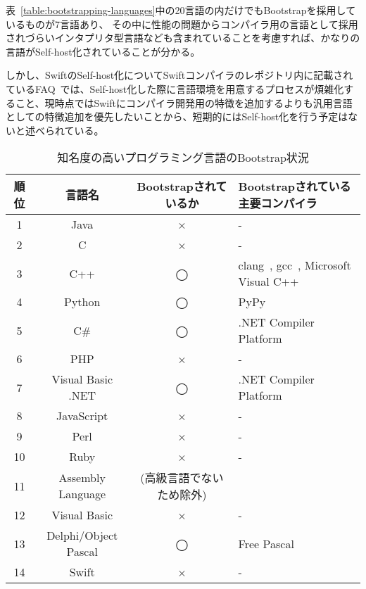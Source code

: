 表~\ref{table:bootstrapping-languages}中の20言語の内だけでもBootstrapを採用しているものが7言語あり、 その中に性能の問題からコンパイラ用の言語として採用されづらいインタプリタ型言語なども含まれていることを考慮すれば、かなりの言語がSelf-host化されていることが分かる。

しかし、SwiftのSelf-host化についてSwiftコンパイラのレポジトリ内に記載されているFAQ~\cite{swift-faq}では、Self-host化した際に言語環境を用意するプロセスが煩雑化すること、現時点ではSwiftにコンパイラ開発用の特徴を追加するよりも汎用言語としての特徴追加を優先したいことから、短期的にはSelf-host化を行う予定はないと述べられている。

\begin{table}[hb]
    \begin{center}
        \caption{知名度の高いプログラミング言語のBootstrap状況}
        \begin{tabular}{|c|c|c|m{4.5cm}|}
            \hline
            順位 & 言語名 & Bootstrapされているか & Bootstrapされている主要コンパイラ\\
            \hline
            1 & Java & × & -\\
            \hline
            2 & C & × & -\\
            \hline
            3 & C++ & ◯ & clang~\cite{clang}, gcc~\cite{gcc}, Microsoft Visual C++~\cite{vcpp}\\
            \hline
            4 & Python & ◯ & PyPy~\cite{pypy-doc}\\
            \hline
            5 & C\# & ◯ & .NET Compiler Platform~\cite{roslyn-doc}\\
            \hline
            6 & PHP & × & - \\
            \hline
            7 & Visual Basic .NET & ◯ & .NET Compiler Platform~\cite{roslyn-doc}\\
            \hline
            8 & JavaScript & × & -\\
            \hline
            9 & Perl & × & -\\
            \hline
            10 & Ruby & × & -\\
            \hline
            11 & Assembly Language & (高級言語でないため除外) &\\
            \hline
            12 & Visual Basic & × & -\\
            \hline
            13 & Delphi/Object Pascal & ◯ & Free Pascal~\cite{free-pascal}\\
            \hline
            14 & Swift & × & -\\

\end{tabular}
\end{center}
\end{table}

